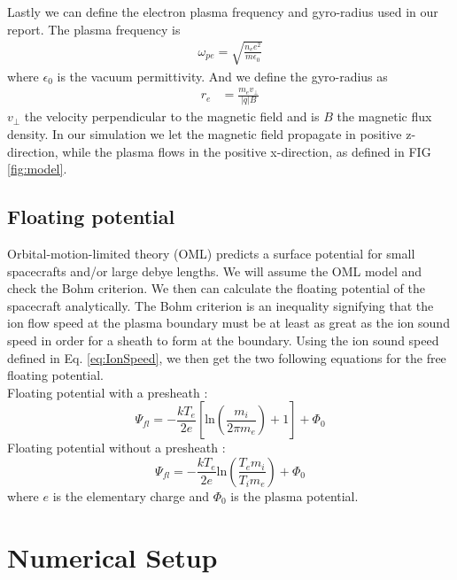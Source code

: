 \documentclass[aip, 
rsi, 
amsmath,
amssymb,
longbibliography,
preprint]{revtex4-1}
\begin{document}
Lastly we can define the electron plasma frequency and gyro-radius used in our report. The plasma frequency is
\begin{align}
\omega_{pe} = \sqrt{\frac{n_e e^2}{m \epsilon_0}}\label{plasmafreq}
\end{align}
where $\epsilon_0$ is the vacuum permittivity. And we define the gyro-radius as 
\begin{align}
r_e &= \frac{m_e v_\perp}{|q| B}\label{eq:gyroradius}
\end{align}
$v_\perp$ the velocity perpendicular to the magnetic field and is $B$ the magnetic flux density. In our simulation we let the magnetic field propagate in positive z-direction, while the plasma flows in the positive x-direction, as defined in FIG \ref{fig:model}.

\subsection{Floating potential}

Orbital-motion-limited theory (OML) predicts a surface potential for small spacecrafts and/or large debye lengths. We will assume the OML model and check the Bohm criterion. We then can calculate the floating potential of the spacecraft analytically. The Bohm criterion is an inequality signifying that the ion flow speed at the plasma boundary must be at least as great as the ion sound speed in order for a sheath to form at the boundary.  Using the ion sound speed defined in Eq. \ref{eq:IonSpeed}, we then get the two following equations for the free floating potential. \\

Floating potential with a presheath \cite{Boef}:
\begin{equation}\label{eq:Boef}
\Psi_{fl} = -\frac{k T_e}{2e}[\text{ln}(\frac{m_i}{2\pi m_e})+1]+\Phi_0
\end{equation}
Floating potential without a presheath \cite{Pesceli}:
\begin{equation}\label{eq:Pesceli}
\Psi_{fl}=-\frac{k T_e}{2e}\text{ln}(\frac{T_em_i}{T_i m_e})+\Phi_0
\end{equation}
where $e$ is the elementary charge and $\Phi_0$ is the plasma potential. \\

\section{\label{sec:numsetup} Numerical Setup}
\end{document}
